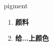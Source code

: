 
\begin{frame}
{\huge pigment}
\begin{center}
\begin{enumerate}\Large
  \item \textbf{颜料}
  \item \textbf{给...上颜色}
\end{enumerate}
\end{center}
\end{frame}
